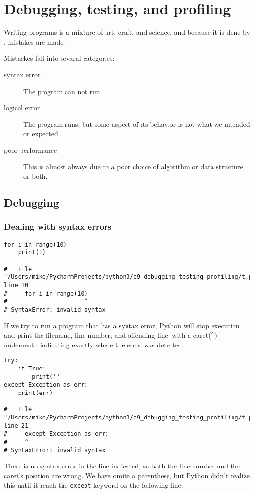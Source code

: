 
\chapter{Debugging, testing, and profiling}

Writing programs is a mixture of art, craft, and science, and because it is done by , mistakes are made.


Mistackes fall into sevaral categories:
\begin{description}
\item[syntax error] The program can not run.
\item[logical error] The program runs, but some aspect of its behavior is not what we intended or expected.
\item[poor performance] This is almost always due to a poor choice of algorithm or data structure or both.
\end{description}

\section{Debugging}


\subsection{Dealing with syntax errors}

\begin{lstlisting}
for i in range(10)
    print(1)

#   File "/Users/mike/PycharmProjects/python3/c9_debugging_testing_profiling/t.py", line 10
#     for i in range(10)
#                      ^
# SyntaxError: invalid syntax  
\end{lstlisting}

If we try to run a program that has a syntax error, Python will stop execution and print the filename, line number, and offending line, with a caret(\^{}) underneath indicating exactly where the error was detected.


\begin{lstlisting}
try:
    if True:
        print(''
except Exception as err:
    print(err)
    
#   File "/Users/mike/PycharmProjects/python3/c9_debugging_testing_profiling/t.py", line 21
#     except Exception as err:
#     ^
# SyntaxError: invalid syntax  
\end{lstlisting}

There is no syntax error in the line indicated, so both the line number and the caret’s position are wrong.
We have omite a parenthese, but Python didn't realize this until it reach the \verb|except| keyword on the following line.




